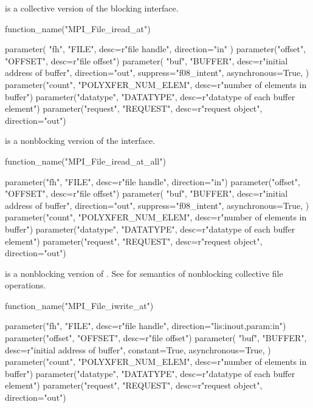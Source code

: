  is a collective version
of the blocking  interface.

%
%
%
\begin{mpi-binding}
    function_name("MPI_File_iread_at")
    
    parameter(
        "fh", "FILE", desc=r"file handle", direction="in"
    )
    parameter("offset", "OFFSET", desc=r"file offset")
    parameter(
        "buf",
        "BUFFER",
        desc=r"initial address of buffer",
        direction="out",
        suppress="f08_intent",
        asynchronous=True,
    )
    parameter("count", "POLYXFER_NUM_ELEM", desc=r"number of elements in buffer")
    parameter("datatype", "DATATYPE", desc=r"datatype of each buffer element")
    parameter("request", "REQUEST", desc=r"request object", direction="out")
\end{mpi-binding}

 is a nonblocking version
of the  interface.

%
%
%
\begin{mpi-binding}
    function_name("MPI_File_iread_at_all")
    
    parameter("fh", "FILE", desc=r"file handle", direction="in")
    parameter("offset", "OFFSET", desc=r"file offset")
    parameter(
        "buf",
        "BUFFER",
        desc=r"initial address of buffer",
        direction="out",
        suppress="f08_intent",
        asynchronous=True,
    )
    parameter("count", "POLYXFER_NUM_ELEM", desc=r"number of elements in buffer")
    parameter("datatype", "DATATYPE", desc=r"datatype of each buffer element")
    parameter("request", "REQUEST", desc=r"request object", direction="out")
\end{mpi-binding}

 is a nonblocking version of
. See
for semantics of nonblocking
collective file operations.

%
%
%
\begin{mpi-binding}
    function_name("MPI_File_iwrite_at")
    
    parameter("fh", "FILE", desc=r"file handle", direction="lis:inout,param:in")
    parameter("offset", "OFFSET", desc=r"file offset")
    parameter(
        "buf",
        "BUFFER",
        desc=r"initial address of buffer",
        constant=True,
        asynchronous=True,
    )
    parameter("count", "POLYXFER_NUM_ELEM", desc=r"number of elements in buffer")
    parameter("datatype", "DATATYPE", desc=r"datatype of each buffer element")
    parameter("request", "REQUEST", desc=r"request object", direction="out")
\end{mpi-binding}


